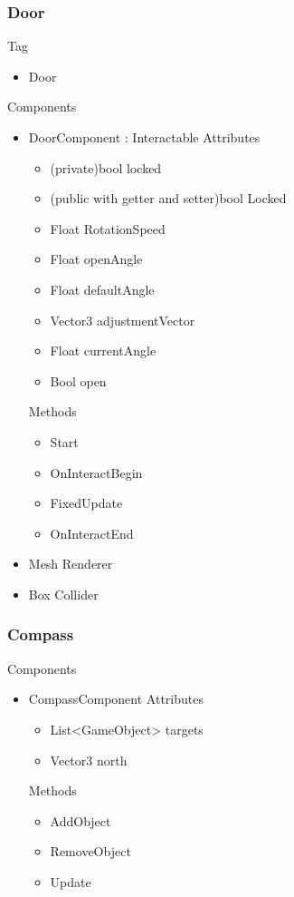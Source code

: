 \documentclass[11pt]{article}
\begin{document}
\subsubsection{Door}
Tag
\begin{itemize}
	\item Door
\end{itemize}
Components
\begin{itemize}
	\item DoorComponent : Interactable
	\newline Attributes
	\begin{itemize}
		\item (private)bool locked
		\item (public with getter and setter)bool Locked
		\item Float RotationSpeed
		\item Float openAngle
		\item Float defaultAngle
		\item Vector3 adjustmentVector
		\item Float currentAngle
		\item Bool open
	\end{itemize}
	Methods
	\begin{itemize}
		\item Start
		\item OnInteractBegin
		\item FixedUpdate
		\item OnInteractEnd
	\end{itemize}
	\item Mesh Renderer
	\item Box Collider
\end{itemize}

\subsubsection{Compass}
Components
\begin{itemize}
	\item CompassComponent
	\newline Attributes
	\begin{itemize}
		\item List<GameObject> targets
		\item Vector3 north
	\end{itemize}
	Methods
	\begin{itemize}
		\item AddObject
		\item RemoveObject
		\item Update
	\end{itemize}
\end{itemize}
\end{document}

